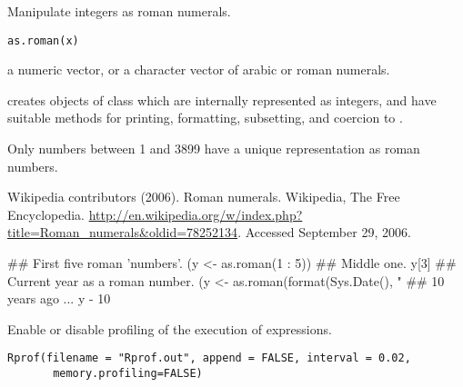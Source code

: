 %
\begin{Description}\relax
Manipulate integers as roman numerals.
\end{Description}
%
\begin{Usage}
\begin{verbatim}
as.roman(x)
\end{verbatim}
\end{Usage}
%
\begin{Arguments}
\begin{ldescription}
\item[\code{x}] a numeric vector, or a character vector of arabic or roman
numerals.
\end{ldescription}
\end{Arguments}
%
\begin{Details}\relax
{} creates objects of class  which are
internally represented as integers, and have suitable methods for
printing, formatting, subsetting, and coercion to .

Only numbers between 1 and 3899 have a unique representation as roman
numbers.
\end{Details}
%
\begin{References}\relax
Wikipedia contributors (2006). Roman numerals.
Wikipedia, The Free Encyclopedia.
\url{http://en.wikipedia.org/w/index.php?title=Roman_numerals&oldid=78252134}.
Accessed September 29, 2006.
\end{References}
%
\begin{Examples}
\begin{ExampleCode}
## First five roman 'numbers'.
(y <- as.roman(1 : 5))
## Middle one.
y[3]
## Current year as a roman number.
(y <- as.roman(format(Sys.Date(), "%
## 10 years ago ...
y - 10
\end{ExampleCode}
\end{Examples}
%
\begin{Description}\relax
Enable or disable profiling of the execution of \R{} expressions.
\end{Description}
%
\begin{Usage}
\begin{verbatim}
Rprof(filename = "Rprof.out", append = FALSE, interval = 0.02,
       memory.profiling=FALSE)
\end{verbatim}
\end{Usage}
